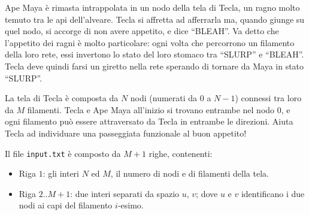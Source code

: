\usepackage{xcolor}
\usepackage{afterpage}
\usepackage{pifont,mdframed}
\usepackage[bottom]{footmisc}



\renewcommand{\inputfile}{\texttt{input.txt}}
\renewcommand{\outputfile}{\texttt{output.txt}}

\newenvironment{warning}
  {\par\begin{mdframed}[linewidth=2pt,linecolor=gray]%
    \begin{list}{}{\leftmargin=1cm
                   \labelwidth=\leftmargin}\item[\Large\ding{43}]}
  {\end{list}\end{mdframed}\par}


{
\vspace{-1.75cm}\hfill{}
}
\vspace{.5cm}


Ape Maya \`e rimasta intrappolata in un nodo della tela di Tecla, un ragno molto temuto tra le api dell'alveare. Tecla si affretta ad afferrarla ma, quando giunge su quel nodo, si accorge di non avere appetito, e dice ``BLEAH''. Va detto che l'appetito dei ragni \`e molto particolare: ogni volta che percorrono un filamento della loro rete, essi invertono lo stato del loro stomaco tra ``SLURP'' e ``BLEAH''. Tecla deve quindi farsi un giretto nella rete sperando di tornare da Maya in stato ``SLURP''.

La tela di Tecla è composta da $N$ nodi (numerati da $0$ a $N-1$) connessi tra loro da $M$ filamenti. Tecla e Ape Maya all'inizio si trovano entrambe nel nodo $0$, e ogni filamento può essere attraversato da Tecla in entrambe le direzioni. Aiuta Tecla ad individuare una passeggiata funzionale al buon appetito!



\InputFile
Il file \inputfile{} è composto da $M+1$ righe, contenenti:
\begin{itemize}[nolistsep,itemsep=2mm]
\item Riga $1$: gli interi $N$ ed $M$, il numero di nodi e di filamenti della tela.
\item Riga $2..M+1$: due interi separati da spazio $u$, $v$; dove $u$ e $v$ identificano i due nodi ai capi del filamento $i$-esimo.
\end{itemize}


